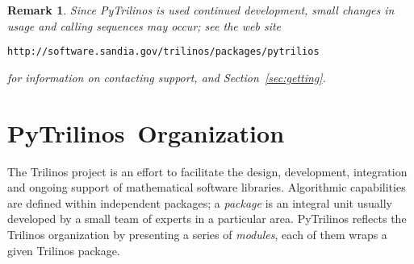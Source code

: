 \documentclass[10pt,relax]{SANDreport}
\newcommand{\PyTrilinos}{{PyTrilinos}}
\newtheorem{remark}{Remark}
\begin{document}
\begin{remark}
Since PyTrilinos is used continued development, small changes in usage and
calling sequences may occur; see the web site
\begin{verbatim}
http://software.sandia.gov/trilinos/packages/pytrilios
\end{verbatim}
for information on contacting support, and Section~\ref{sec:getting}.
\end{remark}

\section{\PyTrilinos\ Organization}
\label{sec:organization}

The Trilinos project is an effort to facilitate the design, development,
  integration and ongoing support of mathematical software libraries. 
  Algorithmic capabilities are defined within independent packages; 
  a {\sl package}
  is an integral unit usually developed by a small team of experts in a
  particular area. PyTrilinos reflects the Trilinos organization by presenting
  a series of {\sl modules}, each of them wraps a given Trilinos package.
\end{document}
